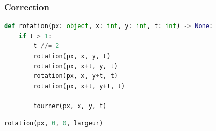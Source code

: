 \documentclass[svgnames,11pt]{beamer}
\begin{document}
\begin{frame}[fragile]
    \frametitle{Correction}

    \begin{center}
        \begin{lstlisting}[language=Python , basicstyle=\ttfamily\small, xleftmargin=2em, xrightmargin=2em]
def rotation(px: object, x: int, y: int, t: int) -> None:
    if t > 1:
        t //= 2
        rotation(px, x, y, t)
        rotation(px, x+t, y, t)
        rotation(px, x, y+t, t)
        rotation(px, x+t, y+t, t)

        tourner(px, x, y, t) 
\end{lstlisting}
        \label{CODE}
    \end{center}
    \begin{center}
        \begin{lstlisting}[language=Python , basicstyle=\ttfamily\small, xleftmargin=2em, xrightmargin=2em]
rotation(px, 0, 0, largeur)
\end{lstlisting}
        \label{CODE}
    \end{center}
\end{frame}
\end{document}
